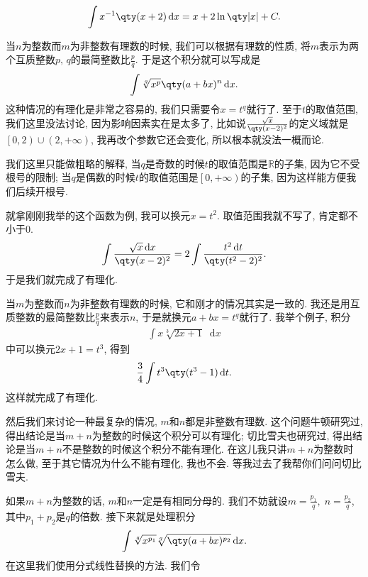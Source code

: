 \documentclass{ctexbook}
\newcommand*{\dif}{\mathop{}\!\mathrm{d}}
\begin{document}
{\begin{align*}
\int x^{-1}\qty(x+2)\dif{x}=x+2\ln\qty|x|+C
.\end{align*}\par
当$n$为整数而$m$为非整数有理数的时候, 我们可以根据有理数的性质, 将$m$表示为两个互质整数$p,\,q$的最简整数比$\frac{p}{q}$. 于是这个积分就可以写成是
\begin{align*}
\int \sqrt[q]{x^{p}}\qty(a+bx)^{n}\dif{x}
.\end{align*}
这种情况的有理化是非常之容易的, 我们只需要令$x=t^{q}$就行了. 至于$t$的取值范围, 我们这里没法讨论, 因为影响因素实在是太多了, 比如说$\frac{\sqrt{x}}{\qty(x-2)^{2}}$的定义域就是$\left[0,2\right)\cup\left(2,+\infty\right)$, 我再改个参数它还会变化, 所以根本就没法一概而论. \par
我们这里只能做粗略的解释, 当$q$是奇数的时候$t$的取值范围是$\mathbb{R}$的子集, 因为它不受根号的限制; 当$q$是偶数的时候$t$的取值范围是$\left[0,+\infty\right)$的子集, 因为这样能方便我们后续开根号. \par
就拿刚刚我举的这个函数为例, 我可以换元$x=t^{2}$. 取值范围我就不写了, 肯定都不小于$0$. 
\begin{align*}
\int\frac{\sqrt{x}\dif{x}}{\qty(x-2)^{2}}=2\int\frac{t^{2}\dif{t}}{\qty(t^{2}-2)^{2}}
.\end{align*}
于是我们就完成了有理化. \par
当$m$为整数而$n$为非整数有理数的时候, 它和刚才的情况其实是一致的. 我还是用互质整数的最简整数比$\frac{p}{q}$来表示$n$, 于是就换元$a+bx=t^{q}$就行了. 我举个例子, 积分
\begin{align*}
\int x\sqrt[3]{2x+1}\dif{x}
\end{align*}
中可以换元$2x+1=t^{3}$, 得到
\begin{align*}
\frac{3}{4}\int t^{3}\qty(t^{3}-1)\dif{t}
.\end{align*}
这样就完成了有理化. \par
然后我们来讨论一种最复杂的情况, $m$和$n$都是非整数有理数. 这个问题牛顿研究过, 得出结论是当$m+n$为整数的时候这个积分可以有理化; 切比雪夫也研究过, 得出结论是当$m+n$不是整数的时候这个积分不能有理化. 在这儿我只讲$m+n$为整数时怎么做, 至于其它情况为什么不能有理化, 我也不会. 等我过去了我帮你们问问切比雪夫. \par
如果$m+n$为整数的话, $m$和$n$一定是有相同分母的. 我们不妨就设$m=\frac{p_{1}}{q},\;n=\frac{p_{2}}{q}$, 其中$p_{1}+p_{2}$是$q$的倍数. 接下来就是处理积分
\begin{align*}
\int\sqrt[q]{x^{p_{1}}}\sqrt[q]{\qty(a+bx)^{p_{2}}}\dif{x}
.\end{align*}
在这里我们使用分式线性替换的方法. 我们令
\begin{align*}

\end{align*}}
\end{document}
